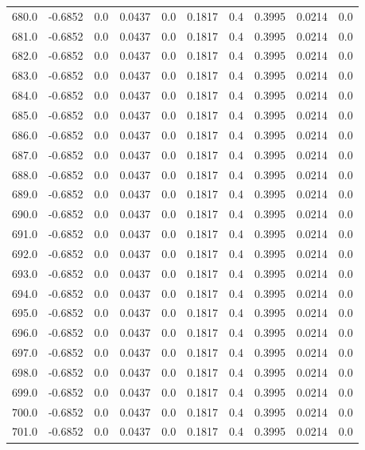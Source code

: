 \begin{longtable}{lrrrrrrrrr}
680.0 & -0.6852 & 0.0 & 0.0437 & 0.0 & 0.1817 & 0.4 & 0.3995 & 0.0214 & 0.0 \\
681.0 & -0.6852 & 0.0 & 0.0437 & 0.0 & 0.1817 & 0.4 & 0.3995 & 0.0214 & 0.0 \\
682.0 & -0.6852 & 0.0 & 0.0437 & 0.0 & 0.1817 & 0.4 & 0.3995 & 0.0214 & 0.0 \\
683.0 & -0.6852 & 0.0 & 0.0437 & 0.0 & 0.1817 & 0.4 & 0.3995 & 0.0214 & 0.0 \\
684.0 & -0.6852 & 0.0 & 0.0437 & 0.0 & 0.1817 & 0.4 & 0.3995 & 0.0214 & 0.0 \\
685.0 & -0.6852 & 0.0 & 0.0437 & 0.0 & 0.1817 & 0.4 & 0.3995 & 0.0214 & 0.0 \\
686.0 & -0.6852 & 0.0 & 0.0437 & 0.0 & 0.1817 & 0.4 & 0.3995 & 0.0214 & 0.0 \\
687.0 & -0.6852 & 0.0 & 0.0437 & 0.0 & 0.1817 & 0.4 & 0.3995 & 0.0214 & 0.0 \\
688.0 & -0.6852 & 0.0 & 0.0437 & 0.0 & 0.1817 & 0.4 & 0.3995 & 0.0214 & 0.0 \\
689.0 & -0.6852 & 0.0 & 0.0437 & 0.0 & 0.1817 & 0.4 & 0.3995 & 0.0214 & 0.0 \\
690.0 & -0.6852 & 0.0 & 0.0437 & 0.0 & 0.1817 & 0.4 & 0.3995 & 0.0214 & 0.0 \\
691.0 & -0.6852 & 0.0 & 0.0437 & 0.0 & 0.1817 & 0.4 & 0.3995 & 0.0214 & 0.0 \\
692.0 & -0.6852 & 0.0 & 0.0437 & 0.0 & 0.1817 & 0.4 & 0.3995 & 0.0214 & 0.0 \\
693.0 & -0.6852 & 0.0 & 0.0437 & 0.0 & 0.1817 & 0.4 & 0.3995 & 0.0214 & 0.0 \\
694.0 & -0.6852 & 0.0 & 0.0437 & 0.0 & 0.1817 & 0.4 & 0.3995 & 0.0214 & 0.0 \\
695.0 & -0.6852 & 0.0 & 0.0437 & 0.0 & 0.1817 & 0.4 & 0.3995 & 0.0214 & 0.0 \\
696.0 & -0.6852 & 0.0 & 0.0437 & 0.0 & 0.1817 & 0.4 & 0.3995 & 0.0214 & 0.0 \\
697.0 & -0.6852 & 0.0 & 0.0437 & 0.0 & 0.1817 & 0.4 & 0.3995 & 0.0214 & 0.0 \\
698.0 & -0.6852 & 0.0 & 0.0437 & 0.0 & 0.1817 & 0.4 & 0.3995 & 0.0214 & 0.0 \\
699.0 & -0.6852 & 0.0 & 0.0437 & 0.0 & 0.1817 & 0.4 & 0.3995 & 0.0214 & 0.0 \\
700.0 & -0.6852 & 0.0 & 0.0437 & 0.0 & 0.1817 & 0.4 & 0.3995 & 0.0214 & 0.0 \\
701.0 & -0.6852 & 0.0 & 0.0437 & 0.0 & 0.1817 & 0.4 & 0.3995 & 0.0214 & 0.0 \\

\end{longtable}
